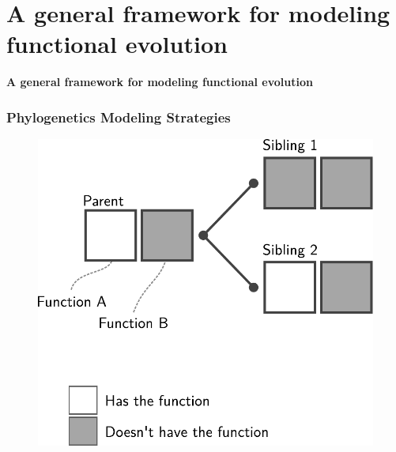 \documentclass[aspectratio=169, 9pt]{beamer}
\begin{document}
\section{A general framework for modeling functional evolution}

\begin{frame}[t]
	\textcolor{uscgold}{
		\Large {\bf A general framework for modeling functional evolution} 
	}
\end{frame}


\begin{frame}[label=aphylo-current]
	\frametitle{Phylogenetics Modeling Strategies}
	
	\begin{minipage}[m]{.3\linewidth}
		
		\begin{figure}
			\includegraphics[width=.9\linewidth]{phylo-model-overview-legend.pdf}
		\end{figure}
		
	\end{minipage}\hfill
	\begin{minipage}[m]{.69\linewidth}
		

\end{minipage}
\end{frame}
\end{document}
